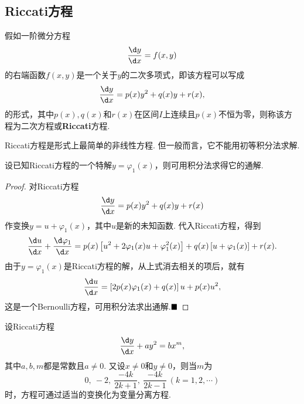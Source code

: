 \documentclass[lang=cn,10pt]{elegantbook}
\begin{document}
\subsection{Riccati方程}
\begin{definition}[Riccati方程]
	假如一阶微分方程
	$$\frac{\d y}{\d x}=f(x,y)$$
	的右端函数$f(x,y)$是一个关于$y$的二次多项式，即该方程可以写成
	$$\frac{\d y}{\d x}=p(x)y^2+q(x)y+r(x),$$
	的形式，其中$p(x),q(x)$和$r(x)$在区间$I$上连续且$p(x)$不恒为零，则称该方程为{\heiti 二次方程}或\textbf{Riccati}{\heiti 方程}. 
\end{definition}
\begin{remark}
	Riccati方程是形式上最简单的非线性方程. 但一般而言，它不能用初等积分法求解.
\end{remark}
\begin{theorem}
	设已知Riccati方程的一个特解$y=\varphi_1(x)$，则可用积分法求得它的通解.
\end{theorem}
\begin{proof}
	对Riccati方程
	$$\frac{\d y}{\d x}=p(x)y^2+q(x)y+r(x)$$
	作变换$y=u+\varphi_1(x)$，其中$u$是新的未知函数. 代入Riccati方程，得到
	$$\frac{\d u}{\d x}+\frac{\d \varphi_1}{\d x}=p(x)\left[u^2+2\varphi_1(x)u+\varphi_1^2(x)\right]+q(x)\left[u+\varphi_1(x)\right]+r(x).$$
	由于$y=\varphi_1(x)$是Riccati方程的解，从上式消去相关的项后，就有
	$$\frac{\d u}{\d x}=\left[2p(x)\varphi_1(x)+q(x)\right]u+p(x)u^2,$$
	这是一个Bernoulli方程，可用积分法求出通解.$\hfill\blacksquare$
\end{proof}
\begin{theorem}
	设Riccati方程
	$$\frac{\d y}{\d x}+ay^2=bx^m,$$
	其中$a,b,m$都是常数且$a\neq 0$. 又设$x\neq 0$和$y\neq 0$，则当$m$为
	$$0,\ -2,\ \frac{-4k}{2k+1},\ \frac{-4k}{2k-1}\ (k=1,2,\cdots)$$
	时，方程可通过适当的变换化为变量分离方程.
\end{theorem}
\end{document}
